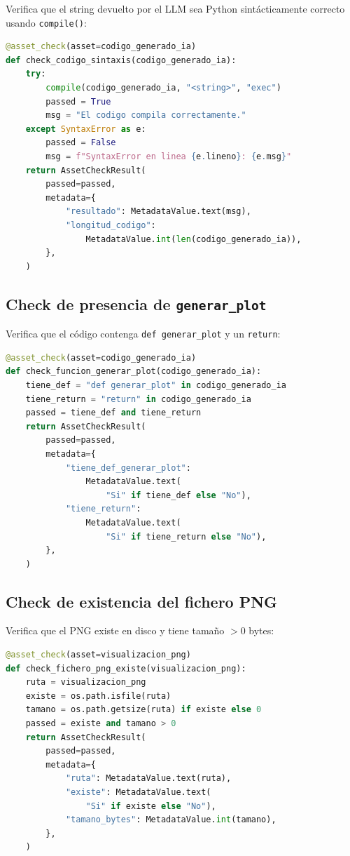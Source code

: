 \documentclass[11pt]{report}
\begin{document}
Verifica que el string devuelto por el LLM sea Python sintácticamente correcto usando
\texttt{compile()}:

\begin{lstlisting}[style=mystyle, language=Python, caption={Check de sintaxis del código generado}]
@asset_check(asset=codigo_generado_ia)
def check_codigo_sintaxis(codigo_generado_ia):
    try:
        compile(codigo_generado_ia, "<string>", "exec")
        passed = True
        msg = "El codigo compila correctamente."
    except SyntaxError as e:
        passed = False
        msg = f"SyntaxError en linea {e.lineno}: {e.msg}"
    return AssetCheckResult(
        passed=passed,
        metadata={
            "resultado": MetadataValue.text(msg),
            "longitud_codigo":
                MetadataValue.int(len(codigo_generado_ia)),
        },
    )
\end{lstlisting}

\subsection{Check de presencia de \texttt{generar\_plot}}

Verifica que el código contenga \texttt{def generar\_plot} y un \texttt{return}:

\begin{lstlisting}[style=mystyle, language=Python, caption={Check de presencia de generar\_plot}]
@asset_check(asset=codigo_generado_ia)
def check_funcion_generar_plot(codigo_generado_ia):
    tiene_def = "def generar_plot" in codigo_generado_ia
    tiene_return = "return" in codigo_generado_ia
    passed = tiene_def and tiene_return
    return AssetCheckResult(
        passed=passed,
        metadata={
            "tiene_def_generar_plot":
                MetadataValue.text(
                    "Si" if tiene_def else "No"),
            "tiene_return":
                MetadataValue.text(
                    "Si" if tiene_return else "No"),
        },
    )
\end{lstlisting}

\subsection{Check de existencia del fichero PNG}

Verifica que el PNG existe en disco y tiene tamaño $> 0$ bytes:

\begin{lstlisting}[style=mystyle, language=Python, caption={Check de existencia del fichero PNG}]
@asset_check(asset=visualizacion_png)
def check_fichero_png_existe(visualizacion_png):
    ruta = visualizacion_png
    existe = os.path.isfile(ruta)
    tamano = os.path.getsize(ruta) if existe else 0
    passed = existe and tamano > 0
    return AssetCheckResult(
        passed=passed,
        metadata={
            "ruta": MetadataValue.text(ruta),
            "existe": MetadataValue.text(
                "Si" if existe else "No"),
            "tamano_bytes": MetadataValue.int(tamano),
        },
    )
\end{lstlisting}
\end{document}
